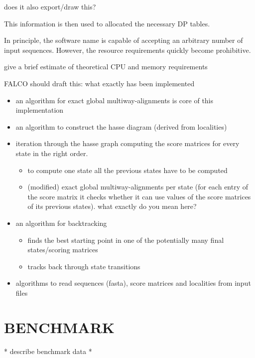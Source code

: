 \documentclass[a4paper,10pt]{article}
\newcommand{\TODO}[1]{\begingroup\color{red}#1\endgroup}
\begin{document}
\TODO{does it also export/draw this?}

This information is then used to allocated the necessary DP tables. 


In principle, the
software \TODO{name} is capable of accepting an arbitrary number of input
sequences. However, the resource requirements quickly become prohibitive.

\TODO{give a brief estimate of theoretical CPU and memory requirements}





\TODO{FALCO should draft this: what exactly has been implemented} 
\begin{itemize}
    \item an algorithm for exact global multiway-alignments is core of this implementation
    \item an algorithm to construct the hasse diagram (derived from localities)
    \item iteration through the hasse graph computing the score matrices for every state in the right order. 
    \begin{itemize}
        \item to compute one state all the previous states have to be computed
        \item (modified) exact global multiway-alignments per state (for
          each entry of the score matrix it checks whether it can use
          values of the score matrices of its previous states).
          \TODO{what exactly do you mean here?} 
    \end{itemize}
    \item an algorithm for backtracking
    \begin{itemize}
        \item finds the best starting point in one of the potentially many final states/scoring matrices
        \item tracks back through state transitions 
    \end{itemize}
    \item algorithms to read sequences (fasta), score matrices and localities from input files
\end{itemize}

\section{\uppercase{Benchmark}}

\TODO{* describe benchmark data *}
\end{document}
